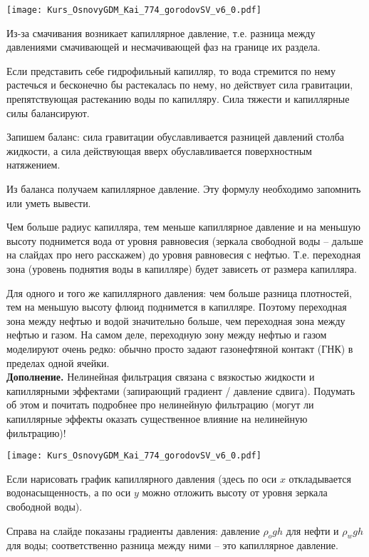 \documentclass[main.tex]{subfiles}
\begin{document}
\texttt{[image: Kurs\_OsnovyGDM\_Kai\_774\_gorodovSV\_v6\_0.pdf]}

Из-за смачивания возникает капиллярное давление, т.е. разница между давлениями смачивающей и несмачивающей фаз на границе их раздела.

Если представить себе гидрофильный капилляр, то вода стремится по нему растечься и бесконечно бы растекалась по нему, но действует сила гравитации, препятствующая растеканию воды по капилляру.
Сила тяжести и капиллярные силы балансируют.

Запишем баланс: сила гравитации обуславливается разницей давлений столба жидкости, а сила действующая вверх обуславливается поверхностным натяжением.

Из баланса получаем капиллярное давление. Эту формулу необходимо запомнить или уметь вывести.

Чем больше радиус капилляра, тем меньше капиллярное давление и на меньшую высоту поднимется вода от уровня равновесия (зеркала свободной воды -- дальше на слайдах про него расскажем) до уровня равновесия с нефтью. Т.е. переходная зона (уровень поднятия воды в капилляре) будет зависеть от размера капилляра.

Для одного и того же капиллярного давления: чем больше разница плотностей, тем на меньшую высоту флюид поднимется в капилляре.
Поэтому переходная зона между нефтью и водой значительно больше, чем переходная зона между нефтью и газом.
На самом деле, переходную зону между нефтью и газом моделируют очень редко: обычно просто задают газонефтяной контакт (ГНК) в пределах одной ячейки.
\\

\textbf{Дополнение.}
Нелинейная фильтрация связана с вязкостью жидкости и капиллярными эффектами (запирающий градиент / давление сдвига). Подумать об этом и почитать подробнее про нелинейную фильтрацию (могут ли капиллярные эффекты оказать существенное влияние на нелинейную фильтрацию)!

\texttt{[image: Kurs\_OsnovyGDM\_Kai\_774\_gorodovSV\_v6\_0.pdf]}

Если нарисовать график капиллярного давления (здесь по оси $x$ откладывается водонасыщенность, а по оси $y$ можно отложить высоту от уровня зеркала свободной воды).

Справа на слайде показаны градиенты давления: давление $\rho_{o} g h$ для нефти и $\rho_{w} g h$ для воды; соответственно разница между ними -- это капиллярное давление.
\\
\end{document}
